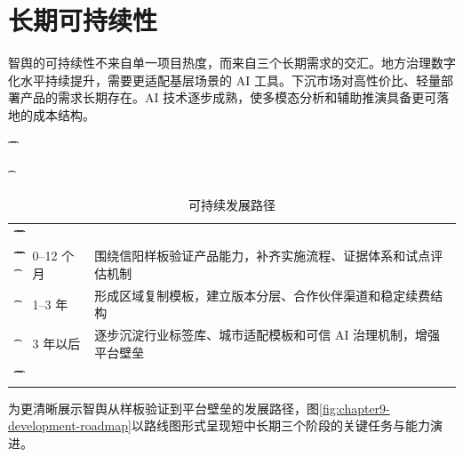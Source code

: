 \section{长期可持续性}

智舆的可持续性不来自单一项目热度，而来自三个长期需求的交汇。地方治理数字化水平持续提升，需要更适配基层场景的 AI 工具。下沉市场对高性价比、轻量部署产品的需求长期存在。AI 技术逐步成熟，使多模态分析和辅助推演具备更可落地的成本结构。

\begin{table}[htbp]
	\t\centering
	\t\caption{可持续发展路径}
	\t\begin{tabularx}{\textwidth}{|L{2.4cm}L{2.3cm}Y|}
		\t\t\toprule
		\t\t{} &  &                      \\
		\t\t\midrule
		\t\t{}
		\t{}           & 0--12 个月       & 围绕信阳样板验证产品能力，补齐实施流程、证据体系和试点评估机制    \\
		\t{}           & 1--3 年         & 形成区域复制模板，建立版本分层、合作伙伴渠道和稳定续费结构      \\
		\t{}           & 3 年以后          & 逐步沉淀行业标签库、城市适配模板和可信 AI 治理机制，增强平台壁垒 \\
		\t\t\bottomrule
		\t\end{tabularx}
\end{table}

为更清晰展示智舆从样板验证到平台壁垒的发展路径，图\ref{fig:chapter9-development-roadmap}以路线图形式呈现短中长期三个阶段的关键任务与能力演进。

